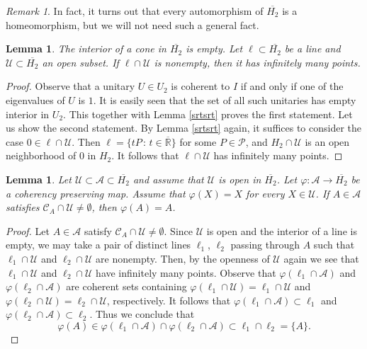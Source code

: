 \documentclass[10pt,a4paper]{amsart}
\newcommand\cP{{\mathcal{P}}}
\newcommand\oH{{\overline{H_2}}}
\newcommand\oR{{\overline{\mathbb{R}}}}
\newtheorem{lemma}[theorem]{Lemma}
\theoremstyle{definition}
\theoremstyle{remark}
\newtheorem{remark}[theorem]{Remark}
\numberwithin{subsection}{section}
\numberwithin{equation}{section}
\begin{document}
\begin{remark}
In fact, it turns out that every automorphism of $\oH$ is a homeomorphism, but we will not need such a general fact.
\end{remark}

\begin{lemma}
The interior of a cone in $\oH$ is empty. 
Let $\ell\subset \oH$ be a line and $\mathcal{U}\subset \oH$ an open subset. 
If $\ell\cap \mathcal{U}$ is nonempty, then it has infinitely many points.  
\end{lemma}
\begin{proof}
Observe that a unitary $U\in U_2$ is coherent to $I$ if and only if one of the eigenvalues of $U$ is $1$. 
It is easily seen that the set of all such unitaries has empty interior in $U_2$. 
This together with Lemma \ref{srtsrt} proves the first statement.
Let us show the second statement. 
By Lemma \ref{srtsrt} again, it suffices to consider the case $0\in \ell\cap \mathcal{U}$. 
Then $\ell=\{tP\,:\, t\in \oR\}$ for some $P\in \cP$, and $H_2\cap \mathcal{U}$ is an open neighborhood of $0$ in $H_2$. It follows that $\ell\cap \mathcal{U}$ has infinitely many points.
\end{proof}


\begin{lemma}\label{ua}
Let $\mathcal{U}\subset \mathcal{A}\subset \oH$ and assume that $\mathcal{U}$ is open in $\oH$. 
Let $\varphi\colon \mathcal{A}\to \oH$ be a coherency preserving map. 
Assume that $\varphi(X)=X$ for every $X\in \mathcal{U}$. 
If $A\in \mathcal{A}$ satisfies $\mathcal{C}_A \cap \mathcal{U}\neq \emptyset$, then $\varphi(A)=A$. 
\end{lemma}
\begin{proof}
Let $A\in \mathcal{A}$ satisfy $\mathcal{C}_A \cap \mathcal{U}\neq \emptyset$.
Since $\mathcal{U}$ is open and the interior of a line is empty, we may take a pair of distinct lines $\ell_1$, $\ell_2$ passing through $A$ such that $\ell_1\cap \mathcal{U}$ and $\ell_2\cap \mathcal{U}$ are nonempty. 
Then, by the openness of $\mathcal{U}$ again we see that $\ell_1\cap \mathcal{U}$ and $\ell_2\cap \mathcal{U}$ have infinitely many points. 
Observe that $\varphi(\ell_1\cap \mathcal{A})$ and $\varphi(\ell_2\cap \mathcal{A})$ are coherent sets containing $\varphi(\ell_1\cap \mathcal{U})=\ell_1\cap \mathcal{U}$ and $\varphi(\ell_2\cap \mathcal{U})=\ell_2\cap \mathcal{U}$, respectively. 
It follows that $\varphi(\ell_1\cap \mathcal{A})\subset \ell_1$ and $\varphi(\ell_2\cap \mathcal{A})\subset \ell_2$. 
Thus we conclude that 
\[
\varphi(A)\in \varphi(\ell_1\cap \mathcal{A})\cap \varphi(\ell_2\cap \mathcal{A})\subset \ell_1\cap \ell_2=\{A\}.
\] 
\end{proof}
\end{document}

